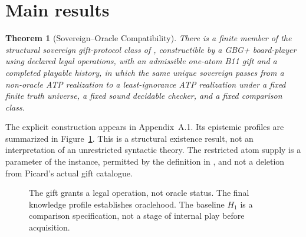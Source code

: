 \documentclass[11pt]{article}
\newtheorem{theorem}{Theorem}[section]
\theoremstyle{definition}\newtheorem{definition}[theorem]{Definition}
\begin{document}
\section{Main results}
\begin{theorem}[Sovereign--Oracle Compatibility]\label{thm:main}
There is a finite member of the structural sovereign gift-protocol class of \cite[Def.~13.1]{gift}, constructible by a GBG+ board-player using declared legal operations, with an admissible one-atom B11 gift and a completed playable history, in which the same unique sovereign passes from a non-oracle ATP realization to a least-ignorance ATP realization under a fixed finite truth universe, a fixed sound decidable checker, and a fixed comparison class.
\end{theorem}
\noindent The explicit construction appears in Appendix~A.1. Its epistemic profiles are summarized in Figure~\ref{fig:bridge}. This is a structural existence result, not an interpretation of an unrestricted syntactic theory. The restricted atom supply is a parameter of the instance, permitted by the definition in \cite{gift}, and not a deletion from Picard's actual gift catalogue.
\begin{figure}[ht]
\centering
{}
\caption{The gift grants a legal operation, not oracle status. The final knowledge profile establishes oraclehood. The baseline $H_1$ is a comparison specification, not a stage of internal play before acquisition.}\label{fig:bridge}
\end{figure}
\end{document}
